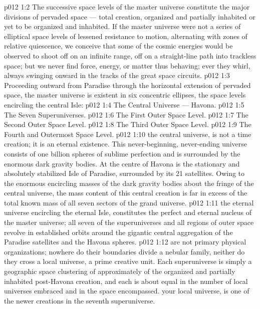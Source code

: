 \vs p012 1:2 The successive space levels of the master universe constitute the major divisions of pervaded space --- total creation, organized and partially inhabited or yet to be organized and inhabited. If the master universe were not a series of elliptical space levels of lessened resistance to motion, alternating with zones of relative quiescence, we conceive that some of the cosmic energies would be observed to shoot off on an infinite range, off on a straight\hyp{}line path into trackless space; but we never find force, energy, or matter thus behaving; ever they whirl, always swinging onward in the tracks of the great space circuits.
\vs p012 1:3 \pc Proceeding outward from Paradise through the horizontal extension of pervaded space, the master universe is existent in six concentric ellipses, the space levels encircling the central Isle:
\vs p012 1:4 \bibnobreakspace The Central Universe --- Havona.
\vs p012 1:5 \bibnobreakspace The Seven Superuniverses.
\vs p012 1:6 \bibnobreakspace The First Outer Space Level.
\vs p012 1:7 \bibnobreakspace The Second Outer Space Level.
\vs p012 1:8 \bibnobreakspace The Third Outer Space Level.
\vs p012 1:9 \bibnobreakspace The Fourth and Outermost Space Level.
\vs p012 1:10 \pc {} the central universe, is not a time creation; it is an eternal existence. This never\hyp{}beginning, never\hyp{}ending universe consists of one billion spheres of sublime perfection and is surrounded by the enormous dark gravity bodies. At the centre of Havona is the stationary and absolutely stabilized Isle of Paradise, surrounded by its 21 satellites. Owing to the enormous encircling masses of the dark gravity bodies about the fringe of the central universe, the mass content of this central creation is far in excess of the total known mass of all seven sectors of the grand universe.
\vs p012 1:11 \pc {} the eternal universe encircling the eternal Isle, constitutes the perfect and eternal nucleus of the master universe; all seven of the superuniverses and all regions of outer space revolve in established orbits around the gigantic central aggregation of the Paradise satellites and the Havona spheres.
\vs p012 1:12  are not primary physical organizations; nowhere do their boundaries divide a nebular family, neither do they cross a local universe, a prime creative unit. Each superuniverse is simply a geographic space clustering of approximately  of the organized and partially inhabited post\hyp{}Havona creation, and each is about equal in the number of local universes embraced and in the space encompassed.  your local universe, is one of the newer creations in  the seventh superuniverse.
